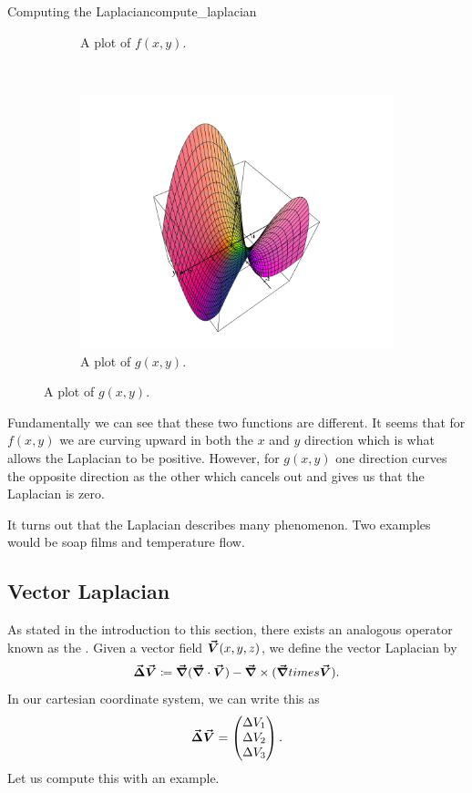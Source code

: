 \begin{ex}{Computing the Laplacian}{compute_laplacian}
\begin{figure}[H]
\begin{subfigure}[h]{.45\textwidth}
                   \caption{A plot of $f(x,y).$}
                   \end{subfigure}
                   ~
                   \begin{subfigure}[h]{.45\textwidth}
                   \includegraphics[width=\textwidth]{Figures_Part_6/0_laplace.png}
                   \caption{A plot of $g(x,y).$}
                   \end{subfigure}
               \end{figure}
               Fundamentally we can see that these two functions are different.  It seems that for $f(x,y)$ we are curving upward in both the $x$ and $y$ direction which is what allows the Laplacian to be positive. However, for $g(x,y)$ one direction curves the opposite direction as the other which cancels out and gives us that the Laplacian is zero.

               It turns out that the Laplacian describes many phenomenon. Two examples would be soap films and temperature flow.
               \end{ex}


               \subsection{Vector Laplacian}

               As stated in the introduction to this section, there exists an analogous operator known as the .  Given a vector field $\boldsymbol{\vec{V}}(x,y,z)$, we define the vector Laplacian by
               \[
               \boldsymbol{\vec{\Delta}} \boldsymbol{\vec{V}} \coloneqq \boldsymbol{\vec{\nabla}}(\boldsymbol{\vec{\nabla}} \cdot \boldsymbol{\vec{V}})-\boldsymbol{\vec{\nabla}} \times (\boldsymbol{\vec{\nabla}} times \boldsymbol{\vec{V}}).
               \]
               In our cartesian coordinate system, we can write this as
               \[
               \boldsymbol{\vec{\Delta}} \boldsymbol{\vec{V}} = \begin{pmatrix} \Delta V_1 \\ \Delta V_2 \\ \Delta V_3 \end{pmatrix}.
               \]
               Let us compute this with an example.

